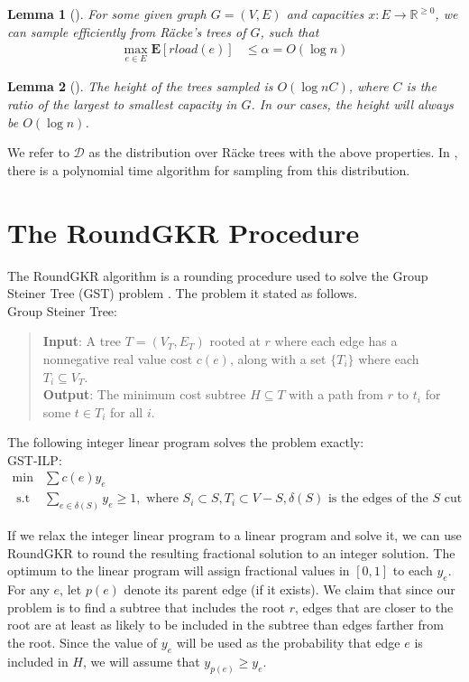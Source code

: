 \documentclass[12pt]{article}
\newtheorem{lemma}{Lemma}
\begin{document}
\begin{lemma}[\cite{racke}]
\label{lem:rload}
For some given graph $G = (V, E)$ and capacities $x: E \rightarrow \mathbb{R}^{\geq 0}$, we can sample efficiently from R\"{a}cke's trees of $G$, such that 
\begin{align}
\max_{e \in E} \textbf{E}[rload(e)] &\leq \alpha = O(\log n) 
\end{align}
\end{lemma}

\begin{lemma}[\cite{ssc}]
\label{thm:height}
The height of the trees sampled is $O(\log nC)$, where $C$ is the ratio of the largest to smallest capacity in $G$. In our cases, the height will always be $O(\log n)$. 
\end{lemma}

We refer to $\mathcal{D}$ as the distribution over R\"{a}cke trees with the above properties. In \cite{racke}, there is a polynomial time algorithm for sampling from this distribution.

\section{The RoundGKR Procedure}

The RoundGKR algorithm is a rounding procedure used to solve the Group Steiner Tree (GST) problem \cite{GKR}. The problem it stated as follows. \\

Group Steiner Tree:
\begin{quote}
\textbf{Input}: A tree $T = (V_T, E_T)$ rooted at $r$ where each edge has a nonnegative real value cost $c(e)$, along with a set $\{T_i\}$ where each $T_i \subseteq V_T$.\\
\textbf{Output}: The minimum cost subtree $H \subseteq T$ with a path from $r$ to $t_i$ for some $t \in T_i$ for all $i$.
\end{quote}

The following integer linear program solves the problem exactly:\\
GST-ILP:
\begin{align}
\min & \sum c(e) y_e  \\
\text{ s.t } & \sum_{e \in \delta(S)} y_e \geq 1, \text{ where } S_i \subset S, T_i \subset V - S, \delta(S) \text{ is the edges of the $S$ cut }
\end{align}

If we relax the integer linear program to a linear program and solve it, we can use RoundGKR to round the resulting fractional solution to an integer solution. The optimum to the linear program will assign fractional values in $[0,1]$ to each $y_e$. For any $e$, let $p(e)$ denote its parent edge (if it exists). We claim that since our problem is to find a subtree that includes the root $r$, edges that are closer to the root are at least as likely to be included in the subtree than edges farther from the root. Since the value of $y_e$ will be used as the probability that edge $e$ is included in $H$, we will assume that $y_{p(e)} \geq y_e$. 
\end{document}
